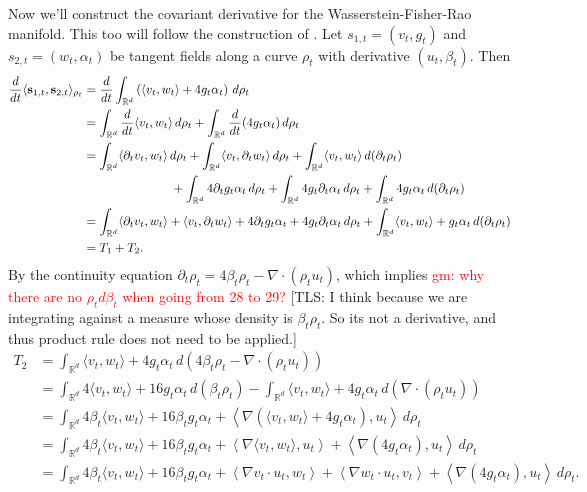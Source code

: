 \documentclass{article}
\newcommand{\tls}[1]{{\color{cyan}[TLS: #1]}}
\begin{document}
Now we'll construct the covariant derivative for the Wasserstein-Fisher-Rao manifold. This too will follow the construction of \citet{clancy2021interpolating}. Let $s_{1, t} = (v_{t}, g_{t})$ and $s_{2, t} = (w_{t}, \alpha_{t})$ be tangent fields along a curve $\rho_t$ with derivative $(u_t, \beta_t)$. Then
\begin{align}
    \frac{d}{dt}\langle \mathbf{s}_{1,t}, \mathbf{s}_{2,t}\rangle_{\rho_t} &= \frac{d}{dt}\int_{\mathbb{R}^d} \left(\langle v_{t}, w_{t} \rangle + 4g_{t}\alpha_{t}\right)\,d\rho_t \\
    &= \int_{\mathbb{R}^d} \frac{d}{dt}\langle v_{t}, w_{t} \rangle \,d\rho_t + \int_{\mathbb{R}^d}\frac{d}{dt}(4g_{t}\alpha_{t})\,d\rho_t \\
    &= \int_{\mathbb{R}^d} \langle \partial_tv_{t}, w_{t} \rangle \,d\rho_t + \int_{\mathbb{R}^d} \langle v_{t}, \partial_tw_{t} \rangle \,d\rho_t + \int_{\mathbb{R}^d} \langle v_{t}, w_{t} \rangle \,d(\partial_t\rho_t) \\
    &\hspace{25mm}+ \int_{\mathbb{R}^d}4\partial_tg_{t}\alpha_{t}\,d\rho_t + \int_{\mathbb{R}^d}4g_{t}\partial_t\alpha_{t}\,d\rho_t + \int_{\mathbb{R}^d}4g_{t}\alpha_{t}\,d(\partial_t\rho_t) \\
    &= \int_{\mathbb{R}^d} \langle \partial_tv_{t}, w_{t} \rangle  + \langle v_{t}, \partial_tw_{t} \rangle  + 4\partial_tg_{t}\alpha_{t} + 4g_{t}\partial_t\alpha_{t}\,d\rho_t + \int_{\mathbb{R}^d}\langle v_t, w_t\rangle +  g_{t}\alpha_{t}\,d(\partial_t\rho_t) \\
    &= T_1 + T_2.
\end{align}
By the continuity equation $\partial_t\rho_t = 4\beta_t\rho_t - \nabla\cdot(\rho_t u_t)$, which implies \textcolor{red}{gm: why there are no $\rho_t d\beta_t$ when going from 28 to 29?} \tls{I think because we are integrating against a measure whose density is $\beta_t\rho_t$. So its not a derivative, and thus product rule does not need to be applied.}
\begin{align}
    T_2 &= \int_{\mathbb{R}^d} \langle v_t, w_t\rangle  + 4g_{t}\alpha_{t}\,d(4\beta_t\rho_t -\nabla\cdot(\rho_tu_t)) \\
    &= \int_{\mathbb{R}^d} 4\langle v_t, w_t\rangle  + 16g_{t}\alpha_{t}\,d(\beta_t\rho_t) - \int_{\mathbb{R}^d} \langle v_t, w_t\rangle  + 4g_{t}\alpha_{t}\,d(\nabla\cdot(\rho_tu_t)) \\
    &= \int_{\mathbb{R}^d} 4\beta_t\langle v_t, w_t\rangle + 16\beta_tg_{t}\alpha_{t} +  \left\langle \nabla \left(\langle v_t, w_t\rangle  + 4g_{t}\alpha_{t}\right), u_t\right\rangle \,d\rho_t \\
    &= \int_{\mathbb{R}^d} 4\beta_t\langle v_t, w_t\rangle + 16\beta_tg_{t}\alpha_{t} +  \left\langle \nabla \langle v_t, w_t\rangle, u_t\right\rangle +  \left\langle \nabla (4g_t\alpha_t), u_t\right\rangle  \,d\rho_t \\
    &= \int_{\mathbb{R}^d} 4\beta_t\langle v_t, w_t\rangle + 16\beta_tg_{t}\alpha_{t} +  \left\langle \nabla v_t \cdot u_t, w_t\right\rangle  + \left\langle\nabla w_t \cdot u_t, v_t\right\rangle + \left\langle\nabla(4g_{t}\alpha_{t}), u_t\right\rangle \,d\rho_t.
\end{align}
\end{document}
